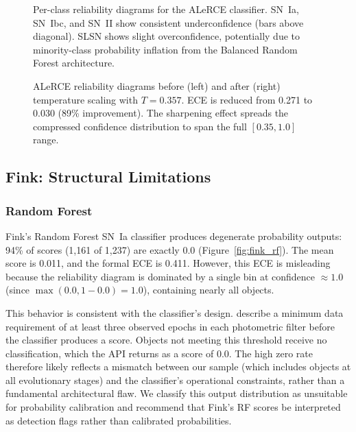 \documentclass[twocolumn]{aastex631}
\begin{document}
\begin{figure}
\caption{Per-class reliability diagrams for the ALeRCE classifier. SN~Ia, SN~Ibc, and SN~II show consistent underconfidence (bars above diagonal). SLSN shows slight overconfidence, potentially due to minority-class probability inflation from the Balanced Random Forest architecture. \label{fig:alerce_perclass}}
\end{figure}

\begin{figure}
\caption{ALeRCE reliability diagrams before (left) and after (right) temperature scaling with $T = 0.357$. ECE is reduced from 0.271 to 0.030 (89\% improvement). The sharpening effect spreads the compressed confidence distribution to span the full $[0.35, 1.0]$ range. \label{fig:alerce_tempscaling}}
\end{figure}


\subsection{Fink: Structural Limitations} \label{sec:fink}

\subsubsection{Random Forest}

Fink's Random Forest SN~Ia classifier produces degenerate probability outputs: 94\% of scores (1,161 of 1,237) are exactly 0.0 (Figure~\ref{fig:fink_rf}). The mean score is 0.011, and the formal ECE is 0.411. However, this ECE is misleading because the reliability diagram is dominated by a single bin at confidence $\approx 1.0$ (since $\max(0.0, 1 - 0.0) = 1.0$), containing nearly all objects.

This behavior is consistent with the classifier's design. \citet{leoni2022} describe a minimum data requirement of at least three observed epochs in each photometric filter before the classifier produces a score. Objects not meeting this threshold receive no classification, which the API returns as a score of 0.0. The high zero rate therefore likely reflects a mismatch between our sample (which includes objects at all evolutionary stages) and the classifier's operational constraints, rather than a fundamental architectural flaw. We classify this output distribution as unsuitable for probability calibration and recommend that Fink's RF scores be interpreted as detection flags rather than calibrated probabilities.
\end{document}
